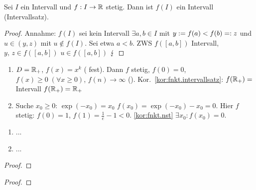 \documentclass[12pt]{scrreprt}
\begin{document}
\begin{kor}\label{kor:fnkt.intervallsatz}
Sei $I$ ein Intervall und $f: I\rightarrow\mathbb{R}$ stetig. Dann ist $f(I)$ ein Intervall (Intervallsatz).
\end{kor}
\begin{proof}
Annahme: $f(I)$ sei kein Intervall \folgt $\exists a, b\in I$ mit $y:= f(a) < f(b) =: z$ und $u\in (y, z)$
mit $u\not\in f(I)$. Sei etwa $a < b$. ZWS \folgt $f([a, b])$ Intervall, $y,\,z\in f([a,b])$ \folgt $u\in f([a,b])$ \folgt $\lightning$
\end{proof}

\begin{bsp}\label{bsp:fnkt.nst-intsatz-bsp}
\begin{enumerate}
\item $D=\mathbb{R}_+$, $f(x)= x^k$ ( fest). Dann $f$ stetig, $f(0)=0$, $f(x) \ge 0\;(\forall x\ge 0)$, 
$f(n)\to\infty$ (\ninf). Kor.~\ref{kor:fnkt.intervallsatz}: $f(\mathbb{R}_+) = $ Intervall \folgt $f(\mathbb{R}_+) = \mathbb{R}_+$\label{bsp:fnkt.nst-intsatz-bsp.a}
\item Suche $x_0 \ge 0$: $\exp(-x_0) = x_0$ \gdw $f(x_0) = \exp(-x_0) - x_0 = 0$. Hier $f$ stetig: 
$f(0)=1$, $f(1)=\frac{1}{e} -1 <0$. \ref{kor:fnkt.nst} \folgt $\exists x_0: f(x_0) = 0$.
\label{bsp:fnkt.nst-intsatz-bsp.b}
\end{enumerate}
\end{bsp}

\begin{dfn}\label{dfn:fnkt.} %

\end{dfn}

\begin{bsp*}
\begin{enumerate}
\item ...
\item ...
\end{enumerate}
\end{bsp*}

\begin{bem}\label{}

\end{bem}
\begin{proof}

\end{proof}

\begin{thm}\label{}

\end{thm}
\begin{proof}

\end{proof}
\end{document}
